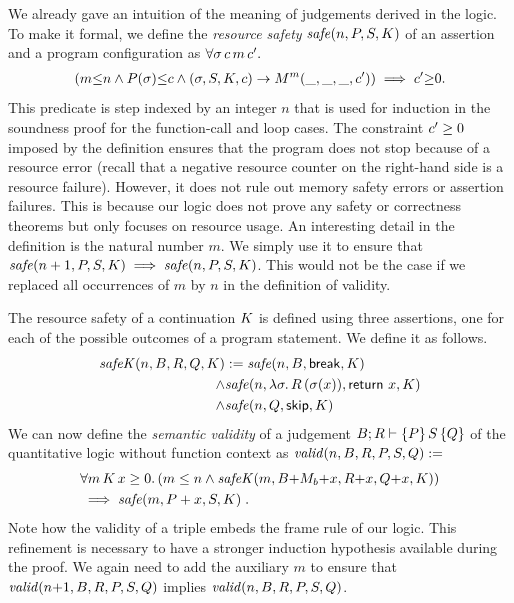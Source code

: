 \documentclass{sigplanconf}
\begin{document}
{We already gave an intuition of the meaning of judgements
derived in the logic.  To make it formal, we define the
\emph{resource safety} $\mathit{safe}(n,P,S,K)$ of an assertion
and a program configuration as $\forall \sigma \, c \, m \, c' .$
\begin{align*}
  (m {\le} n \land P(\sigma) {\le} c \land
    (\sigma, S, K, c) \to{M}^m (\_, \_, \_, c'))
  \implies c' {\ge} 0.
\end{align*}
This predicate is step indexed by an integer $n$ that is used for
induction in the soundness proof for the function-call and loop cases.
The constraint $c' \geq 0$ imposed by the definition ensures that
the program does not stop because of a resource error (recall that a
negative resource counter on the right-hand side is a resource
failure).  However, it does not rule out memory safety errors or
assertion failures. This is because our logic does not prove any
safety or correctness theorems but only focuses on resource usage.
%
An interesting detail in the definition is the natural number $m$.  We
simply use it to ensure that $\mathit{safe}(n+1,P,S,K) \implies \mathit{safe}(n,P,S,K) $.  This would not be the case if we replaced all occurrences of
$m$ by $n$ in the definition of validity.

The resource safety of a continuation $K$ is defined using three
assertions, one for each of the possible outcomes of a program
statement.  We define it as follows.
\begin{align*}
\mathit{safeK}(n,B,R,Q,K) & :=  \mathit{safe}(n,B,\mathsf{break},K) \\
 \land& \mathit{safe}(n,\lambda \sigma.\,R\,(\sigma(x)),\mathsf{return}~x,K) \\
 \land& \mathit{safe}(n,Q,\mathsf{skip},K)
\end{align*}
%
We can now define the \emph{semantic validity} of a judgement $B; R
\vdash \{P\}\, S\, \{Q\}$ of the quantitative logic without function
context as $\mathit{valid}(n,B,R,P,S,Q) :=$
\begin{align*}
& \forall m \, K \, x \geq 0 .\, (m \le n \land \mathit{safeK}(m,B{+}M_b{+}x,R{+}x,Q{+}x,K)) \\
& \implies \mathit{safe}(m,P+x,S,K) \; .
\end{align*}
Note how the validity of a triple embeds the frame rule of
our logic. This refinement is necessary to have a stronger
induction hypothesis available during the proof.
%
We again need to add the auxiliary $m$ to ensure that $\mathit{valid}(n{+}1,B,R,P,S,Q)$ implies $\mathit{valid}(n,B,R,P,S,Q)$.

}
\end{document}
